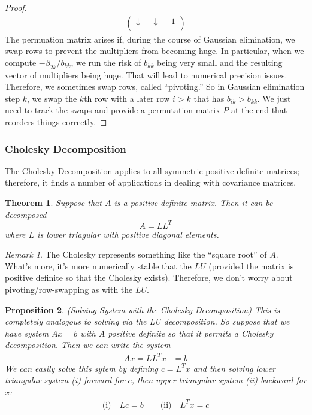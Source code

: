 \documentclass[12pt]{article}
\numberwithin{equation}{section} %
\theoremstyle{plain}
\newtheorem{thm}{Theorem}[section]
\newtheorem{prop}[thm]{Proposition}
\theoremstyle{definition}
\theoremstyle{remark}
\newtheorem*{rmk}{Remark}
\begin{document}
\begin{proof}
\begin{align*}
\begin{pmatrix}
    \downarrow & & \downarrow & & 1 \\
  \end{pmatrix}
\end{align*}
The permuation matrix arises if, during the course of Gaussian
elimination, we swap rows to prevent the multipliers from becoming huge.
In particular, when we compute $-\beta_{2k}/b_{kk}$, we run the risk of
$b_{kk}$ being very small and the resulting vector of multipliers being
huge. That will lead to numerical precision issues. Therefore, we
sometimes swap rows, called ``pivoting.'' So in Gaussian elimination
step $k$, we swap the $k$th row with a later row $i>k$ that has
$b_{ik}>b_{kk}$. We just need to track the swaps and provide a
permutation matrix $P$ at the end that reorders things correctly.
\end{proof}



\subsubsection{Cholesky Decomposition}

The Cholesky Decomposition applies to all symmetric positive definite
matrices; therefore, it finds a number of applications in dealing with
covariance matrices.

\begin{thm}
Suppose that $A$ is a positive definite matrix. Then it
can be decomposed
\begin{equation}
  A = L L^T
\end{equation}
where $L$ is lower triagular with positive diagonal elements.
\end{thm}

\begin{rmk}
The Cholesky represents something like the ``square root'' of $A$.
What's more, it's more numerically stable that the $LU$ (provided the
matrix is positive definite so that the Cholesky exists). Therefore, we
don't worry about pivoting/row-swapping as with the $LU$.
\end{rmk}

\begin{prop}\emph{(Solving System with the Cholesky Decomposition)}
This is completely analogous to solving via the LU decomposition. So
suppose that we have system $Ax=b$ with $A$ positive definite so that it
permits a Cholesky decomposition. Then we can write the system
\begin{align*}
  Ax = LL^Tx&=b
\end{align*}
We can easily solve this sytem by defining $c=L^Tx$ and then solving
lower triangular system (i) forward for $c$, then upper triangular
system (ii) backward for $x$:
\begin{align*}
  \text{(i)}\quad Lc = b
  \qquad
  \text{(ii)}\quad L^Tx = c
\end{align*}
\end{prop}
\end{document}
